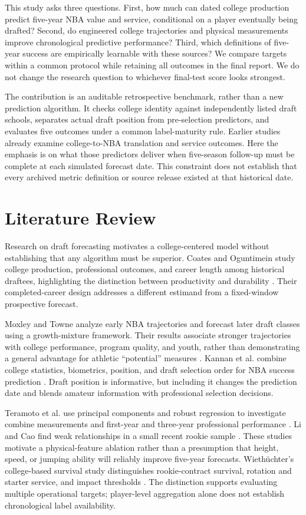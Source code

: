 \documentclass[11pt]{article}
\begin{document}
This study asks three questions. First, how much can dated college production predict five-year NBA value and service, conditional on a player eventually being drafted? Second, do engineered college trajectories and physical measurements improve chronological predictive performance? Third, which definitions of five-year success are empirically learnable with these sources? We compare targets within a common protocol while retaining all outcomes in the final report. We do not change the research question to whichever final-test score looks strongest.

The contribution is an auditable retrospective benchmark, rather than a new prediction algorithm. It checks college identity against independently listed draft schools, separates actual draft position from pre-selection predictors, and evaluates five outcomes under a common label-maturity rule. Earlier studies already examine college-to-NBA translation and service outcomes. Here the emphasis is on what those predictors deliver when five-season follow-up must be complete at each simulated forecast date. This constraint does not establish that every archived metric definition or source release existed at that historical date.

\section{Literature Review}
Research on draft forecasting motivates a college-centered model without establishing that any algorithm must be superior. Coates and Oguntimein study college production, professional outcomes, and career length among historical draftees, highlighting the distinction between productivity and durability \cite{coates}. Their completed-career design addresses a different estimand from a fixed-window prospective forecast.

Moxley and Towne analyze early NBA trajectories and forecast later draft classes using a growth-mixture framework. Their results associate stronger trajectories with college performance, program quality, and youth, rather than demonstrating a general advantage for athletic ``potential'' measures \cite{moxley}. Kannan et al. combine college statistics, biometrics, position, and draft selection order for NBA success prediction \cite{kannan}. Draft position is informative, but including it changes the prediction date and blends amateur information with professional selection decisions.

Teramoto et al. use principal components and robust regression to investigate combine measurements and first-year and three-year professional performance \cite{teramoto}. Li and Cao find weak relationships in a small recent rookie sample \cite{li}. These studies motivate a physical-feature ablation rather than a presumption that height, speed, or jumping ability will reliably improve five-year forecasts. Wieth\"uchter's college-based survival study distinguishes rookie-contract survival, rotation and starter service, and impact thresholds \cite{wiethuchter}. The distinction supports evaluating multiple operational targets; player-level aggregation alone does not establish chronological label availability.
\end{document}
